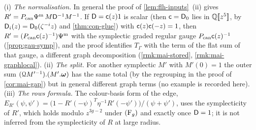 \begin{rmk}
\label{rmk:flh-fail}
(i) \emph{The normalisation.} In general the proof of \cref{lem:flh-inputs}~(ii) gives $R'=P_{\mathrm{can}}\Psi^{\mathrm m}\,M\mathsf{D}^{-1}M^{-1}$. If $\mathsf{D}=\mathsf{c}(z)1$ is scalar (then $\mathsf{c}=\mathsf{D}_0$ lies in $\mathbb{Q}[\![ z^5 ]\!]$, by $\mathsf{D}_i(z)=\mathsf{D}_0(\zeta^{-i}z)$ and \cref{thm:con-glue}) with $\mathsf{c}(z)\mathsf{c}(-z)=1$, then $R'=(P_{\mathrm{can}}\mathsf{c}(z)^{-1})\Psi^{\mathrm m}$ with the symplectic graded regular gauge $P_{\mathrm{can}}\mathsf{c}(z)^{-1}$ (\cref{prop:gau-symp}), and the proof identifies $T_\Gamma$ with the term of the flat sum of that gauge, a different graph decomposition (\cref{rmk:mai-stored}, \cref{rmk:mai-graphlocal}). (ii) \emph{The split.} For another symplectic $M'$ with $M'(0)=1$ the outer sum $(\mathcal{Q} M'^{-1}).(M'.\boldsymbol{\omega})$ has the same total (by the regrouping in the proof of \cref{cor:mai-gap}) but in general different graph terms (no example is recorded here). (iii) \emph{The rows formula.} The colour-basis form of the edge, $E_{R'}(\psi,\psi')=\bigl(1-R'(-\psi)^T\eta^{-1}R'(-\psi')\bigr)/(\psi+\psi')$, uses the symplecticity of $R'$, which holds modulo $z^{3g-2}$ under $(\mathrm{F}_{g})$ and exactly once $\mathsf{D}=1$; it is not inferred from the symplecticity of $R$ at large radius.
\end{rmk}
